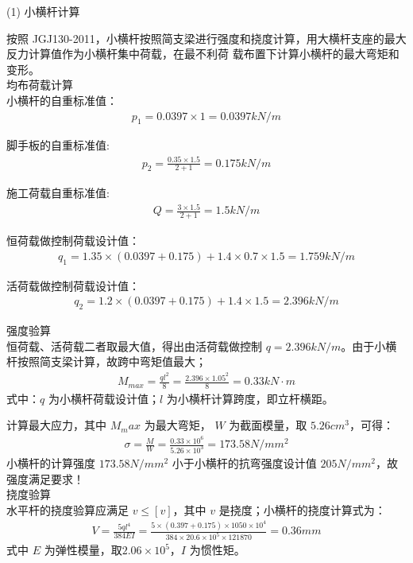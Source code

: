 (1) 小横杆计算

按照 JGJ130-2011，小横杆按照简支梁进行强度和挠度计算，用大横杆支座的最大反力计算值作为小横杆集中荷载，在最不利荷
载布置下计算小横杆的最大弯矩和变形。\\

 均布荷载计算\\

小横杆的自重标准值：
\begin{align}
    p_1=0.0397 \times 1=0.0397 kN/m
\end{align}

脚手板的自重标准值:
\begin{align}
    p_2=\frac{0.35 \times 1.5}{2+1}=0.175 kN/m
\end{align}

施工荷载自重标准值:
\begin{align}
    Q=\frac{3 \times 1.5}{2+1}=1.5 kN/m
\end{align}

恒荷载做控制荷载设计值：
\begin{align}
    q_1=1.35\times(0.0397+0.175)+1.4\times 0.7\times 1.5=1.759 kN/m
\end{align}

活荷载做控制荷载设计值：
\begin{align}
    q_2=1.2\times(0.0397+0.175)+1.4\times 1.5=2.396 kN/m
\end{align}

 强度验算\\

恒荷载、活荷载二者取最大值，得出由活荷载做控制 $q=2.396 kN/m$。由于小横杆按照简支梁计算，故跨中弯矩值最大；
\begin{align}
    M_{max}=\frac{ql^2}{8}=\frac{2.396\times 1.05^2}{8}=0.33 kN\cdot m
\end{align}
式中：$q$ 为小横杆荷载设计值；$l$ 为小横杆计算跨度，即立杆横距。

计算最大应力，其中 $M_max$ 为最大弯矩， $W$ 为截面模量，取 $5.26 cm^3$，可得：
\begin{align}
    \sigma =\frac{M}{W}=\frac{0.33\times 10^6}{5.26\times10^3}=173.58 N/mm^2
\end{align}
小横杆的计算强度 $173.58N/mm^2$ 小于小横杆的抗弯强度设计值 $205N/mm^2$，故强度满足要求！\\

 挠度验算\\

水平杆的挠度验算应满足 $v\leq [v] $，其中 $v$ 是挠度；小横杆的挠度计算式为：
\begin{align}
    V=\frac{5ql^4}{384EI}=\frac{5\times (0.397+0.175)\times 1050\times 10^4}{384\times 20.6\times 10^5\times 121870}=0.36 mm
\end{align}
式中 $E$ 为弹性模量，取$2.06\times 10^5$，$I$ 为惯性矩。

